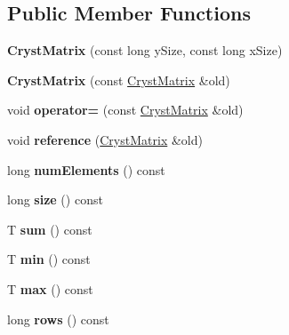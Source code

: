 \subsection*{Public Member Functions}
\begin{DoxyCompactItemize}
\item 
\mbox{\label{class_cryst_matrix_a8efa69213a1bb63c9b5b88cd4c162aec}} 
{\bfseries Cryst\+Matrix} (const long y\+Size, const long x\+Size)
\item 
\mbox{\label{class_cryst_matrix_afa851ee3fa092891cb6c90d6deda4abc}} 
{\bfseries Cryst\+Matrix} (const \mbox{\hyperlink{class_cryst_matrix}{Cryst\+Matrix}} \&old)
\item 
\mbox{\label{class_cryst_matrix_ac268742edcc4262683e7e66be62a032c}} 
void {\bfseries operator=} (const \mbox{\hyperlink{class_cryst_matrix}{Cryst\+Matrix}} \&old)
\item 
\mbox{\label{class_cryst_matrix_ab5c414985f04c70ab8300a9873fe383c}} 
void {\bfseries reference} (\mbox{\hyperlink{class_cryst_matrix}{Cryst\+Matrix}} \&old)
\item 
\mbox{\label{class_cryst_matrix_aca243054095f7aa5e132f62e8068f0e4}} 
long {\bfseries num\+Elements} () const
\item 
\mbox{\label{class_cryst_matrix_a39ecdfe6f32eefcfa9f0df337107f5a9}} 
long {\bfseries size} () const
\item 
\mbox{\label{class_cryst_matrix_a04f206cf5175b0e3f546d038949e39f2}} 
T {\bfseries sum} () const
\item 
\mbox{\label{class_cryst_matrix_aa25a62cb04f5fa19574a9fabdd5e85b5}} 
T {\bfseries min} () const
\item 
\mbox{\label{class_cryst_matrix_ae784bb64b6019405f7c54fc0e785d69a}} 
T {\bfseries max} () const
\item 
\mbox{\label{class_cryst_matrix_a12aad43eacb19627c27b8202ab517ae4}} 
long {\bfseries rows} () const

\end{DoxyCompactItemize}
